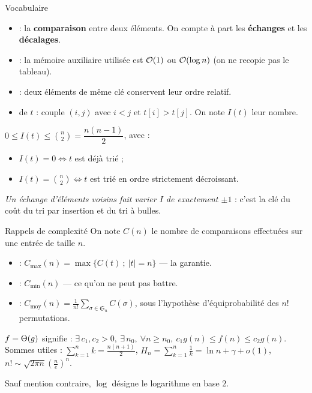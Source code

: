 \documentclass[11pt,aspectratio=169]{beamer}
\begin{document}
\begin{frame}{Vocabulaire}
\begin{itemize}
  \item {} : la \textbf{comparaison} entre deux
        éléments. On compte à part les \textbf{échanges} et les \textbf{décalages}.
  \item {} : la mémoire auxiliaire utilisée est $\mathcal{O}(1)$ ou $\mathcal{O}(\log n)$
        (on ne recopie pas le tableau).
  \item {} : deux éléments de même clé conservent leur ordre relatif.
  \item {} de $t$ : couple $(i,j)$ avec $i\lt j$ et $t[i]\gt t[j]$.
        On note $I(t)$ leur nombre.
\end{itemize}
\vspace{4pt}
\begin{encadre}
\small
$0\le I(t)\le \binom n2=\dfrac{n(n-1)}2$, avec :
\begin{itemize}\setlength\itemsep{1pt}
  \item $I(t)=0 \iff t$ est déjà trié ;
  \item $I(t)=\binom n2 \iff t$ est trié en ordre strictement décroissant.
\end{itemize}
\emph{Un échange d'éléments voisins fait varier $I$ de exactement $\pm1$} :
c'est la clé du coût du tri par insertion et du tri à bulles.
\end{encadre}
\end{frame}

\begin{frame}{Rappels de complexité}
On note $C(n)$ le nombre de comparaisons effectuées sur une entrée de taille $n$.
\begin{itemize}
  \item {} : $C_{\max}(n)=\max\{C(t)\ ;\ |t|=n\}$ --- la garantie.
  \item {} : $C_{\min}(n)$ --- ce qu'on ne peut pas battre.
  \item {} : $\displaystyle C_{\text{moy}}(n)=\frac1{n!}\sum_{\sigma\in\mathfrak S_n} C(\sigma)$,
        sous l'hypothèse d'équiprobabilité des $n!$ permutations.
\end{itemize}
\vspace{4pt}
\begin{encadre}
\small
$f=\Theta(g)$ signifie : $\exists\,c_1,c_2>0,\ \exists\,n_0,\ \forall n\ge n_0,\
c_1 g(n)\le f(n)\le c_2 g(n)$.\\[3pt]
Sommes utiles : $\displaystyle\sum_{k=1}^{n}k=\frac{n(n+1)}2$, \quad
$H_n=\displaystyle\sum_{k=1}^n\frac1k=\ln n+\gamma+o(1)$, \quad
$n!\sim\sqrt{2\pi n}\left(\frac ne\right)^n$.
\end{encadre}
\vspace{2pt}
\centering\footnotesize Sauf mention contraire, $\log$ désigne le logarithme en base $2$.
\end{frame}
\end{document}

